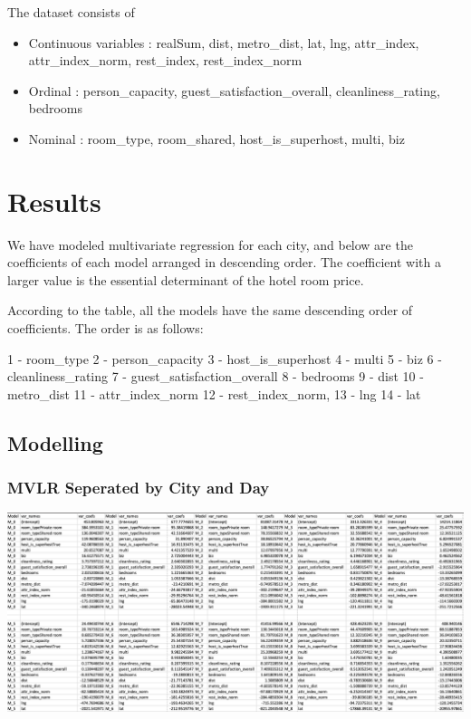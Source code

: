 \documentclass[
]{article}
\providecommand{\tightlist}{%
  \setlength{\itemsep}{0pt}\setlength{\parskip}{0pt}}
\begin{document}
The dataset consists of

\begin{itemize}
\tightlist
\item
  Continuous variables : realSum, dist, metro\_dist, lat, lng,
  attr\_index, attr\_index\_norm, rest\_index, rest\_index\_norm
\item
  Ordinal : person\_capacity, guest\_satisfaction\_overall,
  cleanliness\_rating, bedrooms
\item
  Nominal : room\_type, room\_shared, host\_is\_superhost, multi, biz
\end{itemize}

\hypertarget{results}{%
\section{Results}\label{results}}

We have modeled multivariate regression for each city, and below are the
coefficients of each model arranged in descending order. The coefficient
with a larger value is the essential determinant of the hotel room
price.

According to the table, all the models have the same descending order of
coefficients. The order is as follows:

1 - room\_type 2 - person\_capacity 3 - host\_is\_superhost 4 - multi 5
- biz 6 - cleanliness\_rating 7 - guest\_satisfaction\_overall 8 -
bedrooms 9 - dist 10 - metro\_dist 11 - attr\_index\_norm 12 -
rest\_index\_norm, 13 - lng 14 - lat

\hypertarget{modelling}{%
\subsection{Modelling}\label{modelling}}

\hypertarget{mvlr-seperated-by-city-and-day}{%
\subsubsection{MVLR Seperated by City and
Day}\label{mvlr-seperated-by-city-and-day}}

\includegraphics{a.png}
\end{document}
